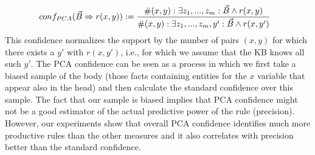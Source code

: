 \[
\small \hspace*{-2ex}
conf_{PCA}(\vec{B} \Rightarrow r(x,y)) := \frac{\#(x,y): \exists z_1,...,z_m: \vec{B} \wedge r(x,y)}{\#(x,y): \exists z_1,...,z_m,y': \vec{B} \wedge r(x,y')}
\]
This confidence normalizes the support by the number of pairs $(x,y)$ for which there exists a $y'$ with $r(x,y')$, i.e., for which we assume that the KB knows all such $y'$.
The PCA confidence can be seen as a process in which we first take a biased sample of the body (those facts containing entities for the $x$ variable that appear also in the head)
and then calculate the standard confidence over this sample. 
The fact that our sample is biased implies that PCA confidence might not be a good estimator of the actual predictive power of the rule (precision).
However, our experiments show that overall PCA confidence identifies much more productive rules than the other measures and it also correlates with precision better than the standard confidence.